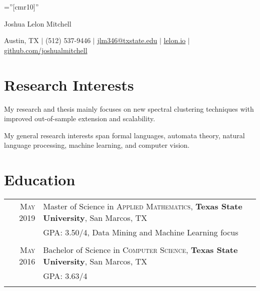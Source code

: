 \documentclass[a4paper,10pt]{article}
\begin{document}

\pagestyle{empty} %

\font\fb=''[cmr10]'' %

\par{\centering
		{\Huge Joshua Lelon Mitchell
	}\par}
\par{\centering
		{
	Austin, TX
	$\mid$
	(512) 537-9446
	$\mid$
	\href {mailto:joshua.mitchell@txstate.edu}{jlm346@txstate.edu}
	$\mid$
	\href {http://lelon.io/blog/2018/01/04/to-potential-employers}{lelon.io}
	$\mid$
	\href {https://github.com/joshualmitchell}{github.com/joshualmitchell}
}\par}


\section{Research Interests}

My research and thesis mainly focuses on new spectral clustering techniques with improved out-of-sample extension and scalability.

My general research interests span formal languages, automata theory, natural language processing, machine learning, and computer vision.

\section{Education}
\begin{tabular}{rl}	
 \textsc{May} 2019 & Master of Science in \textsc{Applied Mathematics}, \textbf{Texas State University}, San Marcos, TX\\
 
&\normalsize \textsc{GPA}: 3.50/4, Data Mining and Machine Learning focus \\ & \\

\textsc{May} 2016 & Bachelor of Science in \textsc{Computer Science}, \textbf{Texas State University}, San Marcos, TX \\

&\normalsize \textsc{GPA}: 3.63/4 \\&\\
\end{tabular}
\end{document}
